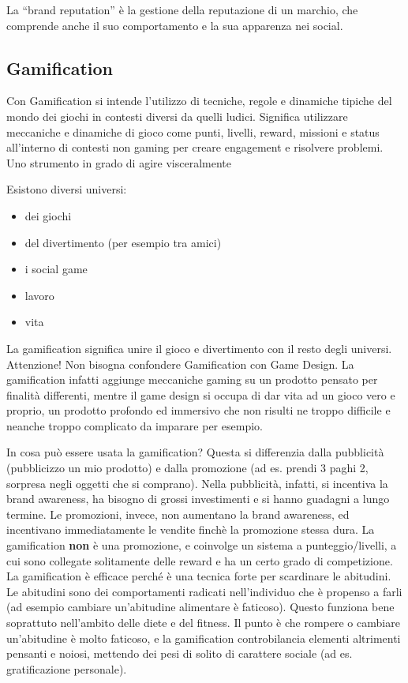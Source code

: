 La ``brand reputation'' è la gestione della reputazione di un marchio, che
comprende anche il suo comportamento e la sua apparenza nei social.

\subsection{Gamification}

Con Gamification si intende l'utilizzo di tecniche, regole e dinamiche tipiche
del mondo dei giochi in contesti diversi da quelli ludici. Significa utilizzare
meccaniche e dinamiche di gioco come punti, livelli, reward, missioni e status
all'interno di contesti non gaming per creare engagement e risolvere problemi.
Uno strumento in grado di agire visceralmente 

Esistono diversi universi:
\begin{itemize}
 \item dei giochi
 \item del divertimento (per esempio tra amici)
 \item i social game
 \item lavoro
 \item vita
\end{itemize}

La gamification significa unire il gioco e divertimento con il resto degli
universi. Attenzione! Non bisogna confondere Gamification con Game Design. La
gamification infatti aggiunge meccaniche gaming su un prodotto pensato per
finalità differenti, mentre il game design si occupa di dar vita ad un gioco
vero e proprio, un prodotto profondo ed immersivo che non risulti ne troppo
difficile e neanche troppo complicato da imparare per esempio.

In cosa può essere usata la gamification? Questa si differenzia dalla
pubblicità (pubblicizzo un mio prodotto) e dalla promozione (ad es. prendi 3
paghi 2, sorpresa negli oggetti che si comprano). Nella pubblicità, infatti, si
incentiva la brand awareness, ha bisogno di grossi investimenti e si hanno
guadagni a lungo termine. Le promozioni, invece, non aumentano la brand
awareness, ed incentivano immediatamente le vendite finchè la promozione stessa
dura. La gamification \textbf{non} è una promozione, e coinvolge un sistema a
punteggio/livelli, a cui sono collegate solitamente delle reward e ha un certo
grado di competizione.
La gamification è efficace perché è una tecnica forte per scardinare le
abitudini. Le abitudini sono dei comportamenti radicati nell'individuo che è
propenso a farli (ad esempio cambiare un'abitudine alimentare è faticoso).
Questo funziona bene soprattuto nell'ambito delle diete e del fitness.
Il punto è che rompere o cambiare un'abitudine è molto faticoso, e la
gamification controbilancia elementi altrimenti pensanti e noiosi, mettendo dei
pesi di solito di carattere sociale (ad es. gratificazione personale).


